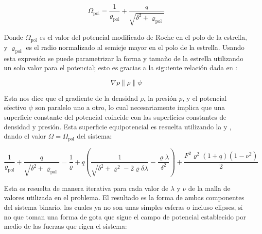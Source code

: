 \begin{eqfloat}[!ht]
	\centering
	\begin{equation}
		\Omega_{\textrm{pol}} = \frac{1}{\varrho_{\textrm{pol}}} + \frac{q}{\sqrt{\delta^2 + \varrho_{\textrm{pol}}}}
	\end{equation}
	\blankcaption
	\label{ecuacionPotencialPoloRadio}
\end{eqfloat}

Donde $\Omega_{\textrm{pol}}$ es el valor del potencial modificado de Roche en
el polo de la estrella, y $\varrho_{\textrm{pol}}$ es el radio normalizado al
semieje mayor en el polo de la estrella. Usando esta expresión se puede
parametrizar la forma y tamaño de la estrella utilizando un solo valor para el
potencial; esto es gracias a la siguiente relación dada en
:

\begin{eqfloat}[!ht]
	\centering
	\begin{equation}
		\nabla p \parallel \rho \parallel \psi
	\end{equation}
\end{eqfloat}

\newpage

Esta nos dice que el gradiente de la densidad $\rho$, la presión $p$, y el
potencial efectivo $\psi$ son paralelo uno a otro, lo cual necesariamente
implica que una superficie constante del potencial coincide con las superficies
constantes de densidad y presión. Esta superficie equipotencial es resuelta
utilizando la  y
, dando el valor $\Omega =
\Omega_{\textrm{pol}}$ del sistema:

\begin{eqfloat}[!ht]
	\centering
	\begin{equation}
		\frac{1}{\varrho_{\textrm{pol}}} + \frac{q}{\sqrt{\delta^2 + \varrho_{\textrm{pol}}}} = \frac{1}{\varrho} + q \left(\frac{1}{\sqrt{\delta^2 + \varrho^2 - 2\varrho \delta \lambda}} - \frac{\varrho \lambda}{\delta^2} \right) + \frac{F^2 \varrho^2 (1 + q)(1 - \nu^2)}{2}
	\end{equation}
	\blankcaption
	\label{ecuacionRadioPolarEstelarEquivalencia}
\end{eqfloat}

Esta es resuelta de manera iterativa para cada valor de $\lambda$ y $\nu$ de la
malla de valores utilizada en el problema. El resultado es la forma de ambas
componentes del sistema binario, las cuales ya no son unas simples esferas o
incluso elipses, si no que toman una forma de gota que sigue el campo de
potencial establecido por medio de las fuerzas que rigen el sistema:

